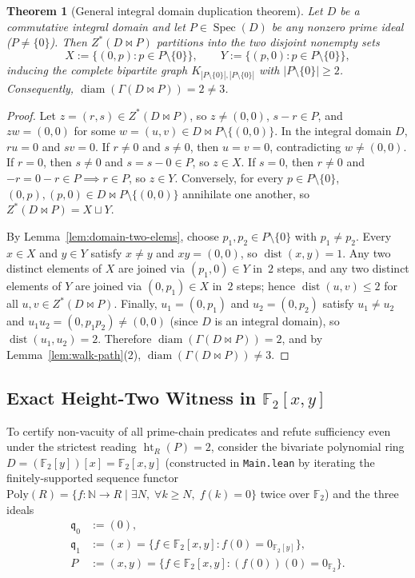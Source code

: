 \documentclass[11pt]{article}
\newtheorem{theorem}{Theorem}[section]
\theoremstyle{definition}
\newcommand{\Spec}{\operatorname{Spec}}
\newcommand{\diam}{\operatorname{diam}}
\newcommand{\dist}{\operatorname{dist}}
\newcommand{\htop}{\operatorname{ht}}
\newcommand{\FF}{\mathbb{F}}
\newcommand{\NN}{\mathbb{N}}
\begin{document}
\begin{theorem}[General integral domain duplication theorem]\label{thm:domain-dup}
Let $D$ be a commutative integral domain and let $P \in \Spec(D)$ be any nonzero prime
ideal ($P \neq \{0\}$). Then $Z^*(D \bowtie P)$ partitions into the two disjoint nonempty
sets
\[
  X := \{(0, p) : p \in P \setminus \{0\}\}, \qquad
  Y := \{(p, 0) : p \in P \setminus \{0\}\},
\]
inducing the complete bipartite graph $K_{|P \setminus \{0\}|, |P \setminus \{0\}|}$ with
$|P \setminus \{0\}| \ge 2$. Consequently, $\diam(\Gamma(D \bowtie P)) = 2 \neq 3$.
\end{theorem}
\begin{proof}
Let $z = (r, s) \in Z^*(D \bowtie P)$, so $z \neq (0, 0)$, $s - r \in P$, and $z w = (0, 0)$
for some $w = (u, v) \in D \bowtie P \setminus \{(0, 0)\}$. In the integral domain $D$,
$r u = 0$ and $s v = 0$. If $r \neq 0$ and $s \neq 0$, then $u = v = 0$, contradicting
$w \neq (0, 0)$. If $r = 0$, then $s \neq 0$ and $s = s - 0 \in P$, so $z \in X$. If
$s = 0$, then $r \neq 0$ and $-r = 0 - r \in P \implies r \in P$, so $z \in Y$.
Conversely, for every $p \in P \setminus \{0\}$, $(0, p), (p, 0) \in D \bowtie P \setminus \{(0, 0)\}$
annihilate one another, so $Z^*(D \bowtie P) = X \sqcup Y$.

By Lemma~\ref{lem:domain-two-elems}, choose $p_1, p_2 \in P \setminus \{0\}$ with
$p_1 \neq p_2$. Every $x \in X$ and $y \in Y$ satisfy $x \neq y$ and $x y = (0, 0)$, so
$\dist(x, y) = 1$. Any two distinct elements of $X$ are joined via $(p_1, 0) \in Y$ in~$2$
steps, and any two distinct elements of $Y$ are joined via $(0, p_1) \in X$ in~$2$ steps;
hence $\dist(u, v) \le 2$ for all $u, v \in Z^*(D \bowtie P)$. Finally,
$u_1 = (0, p_1)$ and $u_2 = (0, p_2)$ satisfy $u_1 \neq u_2$ and
$u_1 u_2 = (0, p_1 p_2) \neq (0, 0)$ (since $D$ is an integral domain), so
$\dist(u_1, u_2) = 2$. Therefore $\diam(\Gamma(D \bowtie P)) = 2$, and by
Lemma~\ref{lem:walk-path}(2), $\diam(\Gamma(D \bowtie P)) \neq 3$.
\end{proof}

\subsection{Exact Height-Two Witness in \texorpdfstring{$\FF_2[x, y]$}{F2[x, y]}}

To certify non-vacuity of all prime-chain predicates and refute sufficiency even under the
strictest reading $\htop_R(P) = 2$, consider the bivariate polynomial ring
$D = (\FF_2[y])[x] = \FF_2[x, y]$ (constructed in \texttt{Main.lean} by iterating the
finitely-supported sequence functor $\mathrm{Poly}(R) = \{f : \NN \to R \mid \exists N,\; \forall k \ge N,\; f(k) = 0\}$
twice over $\FF_2$) and the three ideals
\begin{align*}
  \mathfrak{q}_0 &:= (0), \\
  \mathfrak{q}_1 &:= (x) = \{f \in \FF_2[x, y] : f(0) = 0_{\FF_2[y]}\}, \\
  P &:= (x, y) = \{f \in \FF_2[x, y] : (f(0))(0) = 0_{\FF_2}\}.
\end{align*}
\end{document}
